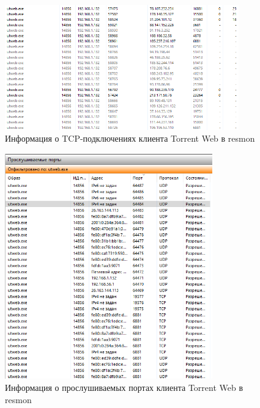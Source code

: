 \documentclass[bachelor, och, coursework]{SCWorks}
\begin{document}
\begin{figure}[H]
    \centering
    \includegraphics[width=0.9\textwidth]{test3_resmon1.2.png}
    \caption{Информация о TCP-подключениях клиента \textmu Torrent Web в resmon}
    \label{test3_resmon1.2}
\end{figure}

\begin{figure}[H]
    \centering
    \includegraphics[width=0.8\textwidth]{test3_resmon2.png}
    \caption{Информация о прослушиваемых портах клиента \textmu Torrent Web в resmon}
    \label{test3_resmon2}
\end{figure}
\end{document}
